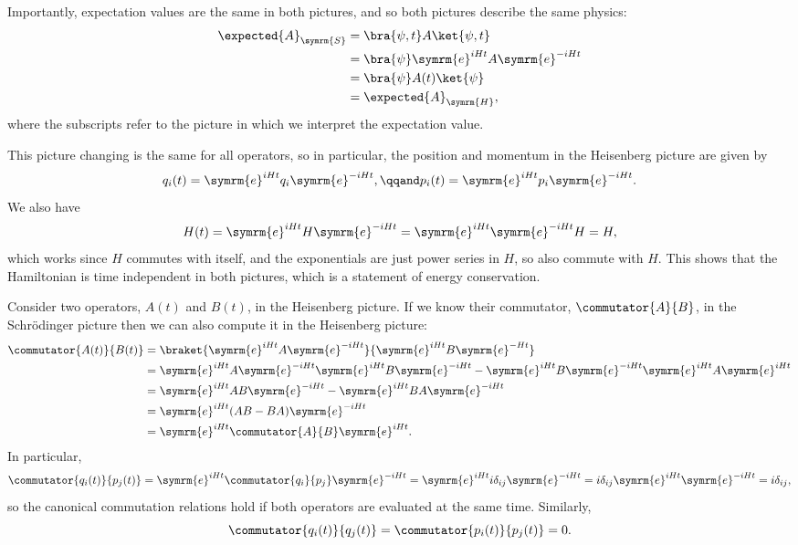 \documentclass[fleqn]{NotesClass}
\newcommand{\e}{\symrm{e}}
\begin{document}
    Importantly, expectation values are the same in both pictures, and so both pictures describe the same physics:
    \begin{align}
        \expected{A}_{\symrm{S}} &= \bra{\psi, t} A \ket{\psi, t}\\
        &= \bra{\psi} \e^{iHt} A \e^{-iHt}\\
        &= \bra{\psi} A(t) \ket{\psi}\\
        &= \expected{A}_{\symrm{H}},
    \end{align}
    where the subscripts refer to the picture in which we interpret the expectation value.
    
    This picture changing is the same for all operators, so in particular, the position and momentum in the Heisenberg picture are given by
    \begin{equation}
        q_i(t) = \e^{iHt}q_i\e^{-iHt}, \qqand p_i(t) = \e^{iHt}p_i\e^{-iHt}.
    \end{equation}
    We also have
    \begin{equation}
        H(t) = \e^{iHt} H \e^{-iHt} = \e^{iHt}\e^{-iHt} H = H,
    \end{equation}
    which works since \(H\) commutes with itself, and the exponentials are just power series in \(H\), so also commute with \(H\).
    This shows that the Hamiltonian is time independent in both pictures, which is a statement of energy conservation.
    
    Consider two operators, \(A(t)\) and \(B(t)\), in the Heisenberg picture.
    If we know their commutator, \(\commutator{A}{B}\), in the Schrödinger picture then we can also compute it in the Heisenberg picture:
    \begin{align}
        \commutator{A(t)}{B(t)} &= \braket{\e^{iHt}A\e^{-iHt}}{\e^{iHt}B\e^{-Ht}}\\
        &= \e^{iHt}A\e^{-iHt}\e^{iHt}B\e^{-iHt} - \e^{iHt}B\e^{-iHt}\e^{iHt}A\e^{iHt}\\
        &= \e^{iHt}AB\e^{-iHt} - \e^{iHt}BA\e^{-iHt}\\
        &= \e^{iHt}(AB - BA)\e^{-iHt}\\
        &= \e^{iHt}\commutator{A}{B}\e^{iHt}.
    \end{align}
    In particular,
    \begin{equation}
        \commutator{q_i(t)}{p_j(t)} = \e^{iHt}\commutator{q_i}{p_j}\e^{-iHt} = \e^{iHt}i\delta_{ij}\e^{-iHt} = i\delta_{ij}\e^{iHt}\e^{-iHt} = i\delta_{ij},
    \end{equation}
    so the canonical commutation relations hold if both operators are evaluated at the same time.
    Similarly,
    \begin{equation}
        \commutator{q_i(t)}{q_j(t)} = \commutator{p_i(t)}{p_j(t)} = 0.
    \end{equation}
    
\end{document}
